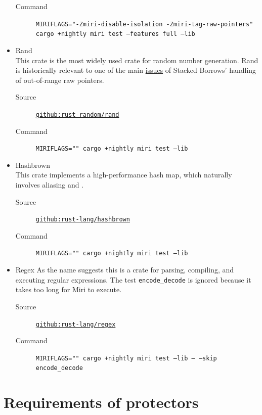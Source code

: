 \documentclass[a4paper,11pt]{article}
\theoremstyle{plain}
\theoremstyle{definition}
\theoremstyle{remark}
\newcommand{\tcode}[1]{\rstinline{#1}}
\begin{document}
\begin{itemize}
\begin{description}
            \item[Command] \texttt{MIRIFLAGS="-Zmiri-disable-isolation -Zmiri-tag-raw-pointers"} \\
                \texttt{cargo +nightly miri test --features full --lib}
        \end{description}
    \item Rand\\
        This crate is the most widely used crate for random number generation.
        Rand is historically relevant to one of the main
        \href{https://github.com/rust-lang/unsafe-code-guidelines/issues/134}{issues}
        of Stacked Borrows' handling of out-of-range raw pointers.
        \begin{description}
            \item[Source] \href{https://github.com/rust-random/rand}{\texttt{github:rust-random/rand}}
            \item[Command] \texttt{MIRIFLAGS="" cargo +nightly miri test --lib}
        \end{description}
    \item Hashbrown\\
        This crate implements a high-performance hash map, which naturally involves aliasing and \tcode{unsafe}.
        \begin{description}
            \item[Source] \href{https://github.com/rust-lang/hashbrown}{\texttt{github:rust-lang/hashbrown}}
            \item[Command] \texttt{MIRIFLAGS="" cargo +nightly miri test --lib}
        \end{description}
    \item Regex
        As the name suggests this is a crate for parsing, compiling, and executing regular expressions.
        The test \texttt{encode\_decode} is ignored because it takes too long for Miri to execute.
        \begin{description}
            \item[Source] \href{https://github.com/rust-lang/regex}{\texttt{github:rust-lang/regex}}
            \item[Command] \texttt{MIRIFLAGS="" cargo +nightly miri test --lib -- --skip encode\_decode}
        \end{description}
\end{itemize}

\section{Requirements of protectors}
\label{app:need-protect}
\end{document}
